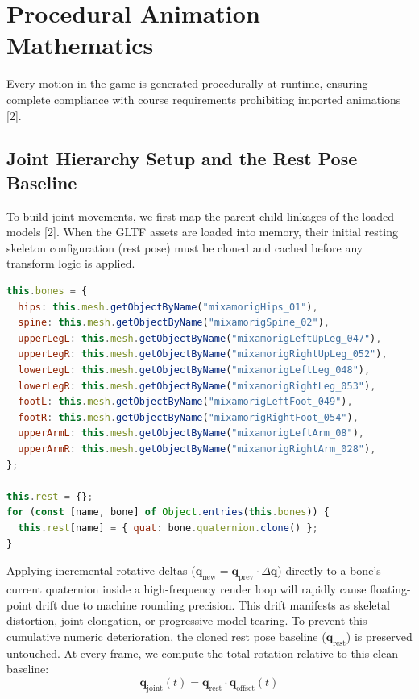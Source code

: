 \documentclass[11pt,a4paper,oneside]{article}
\begin{document}
\newpage
\section{Procedural Animation Mathematics}
Every motion in the game is generated procedurally at runtime, ensuring complete compliance with course requirements prohibiting imported animations [2].

\subsection{Joint Hierarchy Setup and the Rest Pose Baseline}
To build joint movements, we first map the parent-child linkages of the loaded models [2]. When the GLTF assets are loaded into memory, their initial resting skeleton configuration (rest pose) must be cloned and cached before any transform logic is applied. 

\begin{lstlisting}[language=JavaScript, caption={Caching rest pose states on startup in player.js}]
this.bones = {
  hips: this.mesh.getObjectByName("mixamorigHips_01"),
  spine: this.mesh.getObjectByName("mixamorigSpine_02"),
  upperLegL: this.mesh.getObjectByName("mixamorigLeftUpLeg_047"),
  upperLegR: this.mesh.getObjectByName("mixamorigRightUpLeg_052"),
  lowerLegL: this.mesh.getObjectByName("mixamorigLeftLeg_048"),
  lowerLegR: this.mesh.getObjectByName("mixamorigRightLeg_053"),
  footL: this.mesh.getObjectByName("mixamorigLeftFoot_049"),
  footR: this.mesh.getObjectByName("mixamorigRightFoot_054"),
  upperArmL: this.mesh.getObjectByName("mixamorigLeftArm_08"),
  upperArmR: this.mesh.getObjectByName("mixamorigRightArm_028"),
};

this.rest = {};
for (const [name, bone] of Object.entries(this.bones)) {
  this.rest[name] = { quat: bone.quaternion.clone() };
}
\end{lstlisting}

Applying incremental rotative deltas ($\mathbf{q}_{\text{new}} = \mathbf{q}_{\text{prev}} \cdot \Delta\mathbf{q}$) directly to a bone's current quaternion inside a high-frequency render loop will rapidly cause floating-point drift due to machine rounding precision. This drift manifests as skeletal distortion, joint elongation, or progressive model tearing. To prevent this cumulative numeric deterioration, the cloned rest pose baseline ($\mathbf{q}_{\text{rest}}$) is preserved untouched. At every frame, we compute the total rotation relative to this clean baseline:
\begin{equation}
    \mathbf{q}_{\text{joint}}(t) = \mathbf{q}_{\text{rest}} \cdot \mathbf{q}_{\text{offset}}(t)
\end{equation}
\end{document}
